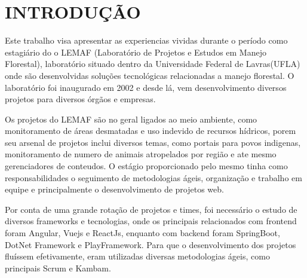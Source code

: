 \chapter{INTRODUÇÃO}

Este trabalho visa apresentar as experiencias vividas durante o período como estagiário do o LEMAF (Laboratório de Projetos e Estudos
em Manejo Florestal), laboratório situado dentro da Universidade Federal de Lavras(UFLA) onde são desenvolvidas soluções tecnológicas relacionadas a manejo florestal.
O laboratório foi inaugurado em 2002 e desde lá, vem desenvolvimento diversos projetos para diversos órgãos e empresas.

Os projetos do LEMAF são no geral ligados ao meio ambiente, como monitoramento de áreas desmatadas e uso indevido de recursos hídricos, porem seu arsenal de projetos inclui diversos temas, como portais para povos indigenas, monitoramento de numero de animais atropelados por região e ate mesmo gerenciadores de conteudos.   
O estágio proporcionado pelo mesmo tinha como responsabilidades o seguimento de metodologias ágeis, organização e trabalho em equipe e principalmente o desenvolvimento de projetos web.

Por conta de uma grande rotação de projetos e times, foi necessário o estudo de diversos frameworks e tecnologias, onde os principais relacionados com frontend foram Angular, Vuejs e ReactJs, enquanto com backend foram SpringBoot, DotNet Framework e PlayFramework.
Para que o desenvolvimento dos projetos fluíssem efetivamente, eram utilizadas diversas metodologias ágeis, como principais Scrum e Kambam.